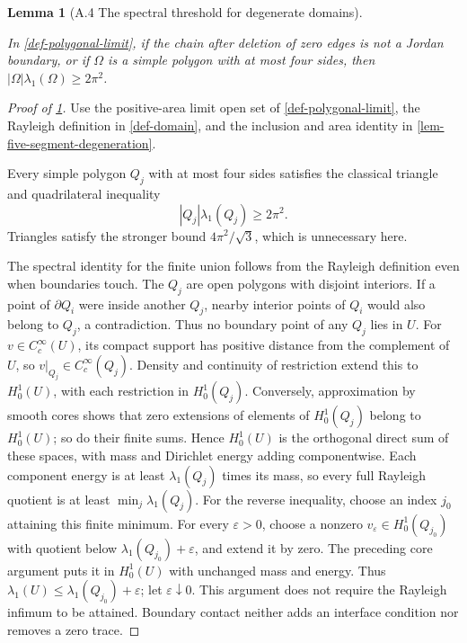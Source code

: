 \documentclass[11pt,a4paper]{article}
\theoremstyle{proofmanuscript}
\newtheorem{lemma}[theorem]{Lemma}
\begin{document}
\begin{lemma}[A.4 The spectral threshold for degenerate domains]\label{lem-degenerate-threshold}

In \ref{def-polygonal-limit}, if the chain after deletion of zero edges is not a Jordan boundary, or if \(\Omega\) is a simple polygon with at most four sides, then \(|\Omega|\lambda_1(\Omega)\ge2\pi^2\).

\end{lemma}

\begin{proof}[Proof of \ref{lem-degenerate-threshold}]

Use the positive-area limit open set of \ref{def-polygonal-limit}, the Rayleigh definition in \ref{def-domain}, and the inclusion and area identity in \ref{lem-five-segment-degeneration}.

Every simple polygon \(Q_j\) with at most four sides satisfies the classical triangle and quadrilateral inequality \[
|Q_j|\lambda_1(Q_j)\ge2\pi^2.
\] Triangles satisfy the stronger bound \(4\pi^2/\sqrt3\), which is unnecessary here.

The spectral identity for the finite union follows from the Rayleigh definition even when boundaries touch. The \(Q_j\) are open polygons with disjoint interiors. If a point of \(\partial Q_i\) were inside another \(Q_j\), nearby interior points of \(Q_i\) would also belong to \(Q_j\), a contradiction. Thus no boundary point of any \(Q_j\) lies in \(U\). For \(v\in C_c^\infty(U)\), its compact support has positive distance from the complement of \(U\), so \(v|_{Q_j}\in C_c^\infty(Q_j)\). Density and continuity of restriction extend this to \(H_0^1(U)\), with each restriction in \(H_0^1(Q_j)\). Conversely, approximation by smooth cores shows that zero extensions of elements of \(H_0^1(Q_j)\) belong to \(H_0^1(U)\); so do their finite sums. Hence \(H_0^1(U)\) is the orthogonal direct sum of these spaces, with mass and Dirichlet energy adding componentwise. Each component energy is at least \(\lambda_1(Q_j)\) times its mass, so every full Rayleigh quotient is at least \(\min_j\lambda_1(Q_j)\). For the reverse inequality, choose an index \(j_0\) attaining this finite minimum. For every \(\varepsilon>0\), choose a nonzero \(v_\varepsilon\in H_0^1(Q_{j_0})\) with quotient below \(\lambda_1(Q_{j_0})+\varepsilon\), and extend it by zero. The preceding core argument puts it in \(H_0^1(U)\) with unchanged mass and energy. Thus \(\lambda_1(U)\le\lambda_1(Q_{j_0})+\varepsilon\); let \(\varepsilon\downarrow0\). This argument does not require the Rayleigh infimum to be attained. Boundary contact neither adds an interface condition nor removes a zero trace.


\end{proof}
\end{document}
